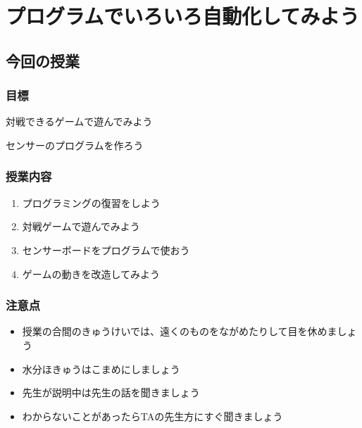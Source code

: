 \chapter{プログラムでいろいろ自動化してみよう}
\section{今回の授業}
\subsection{目標}
対戦できるゲームで遊んでみよう

センサーのプログラムを作ろう

\subsection{授業内容}
\begin{enumerate}
    \item プログラミングの復習をしよう
    \item 対戦ゲームで遊んでみよう
    \item センサーボードをプログラムで使おう
    \item ゲームの動きを改造してみよう
\end{enumerate}

\subsection{注意点}
\begin{itemize}
    \item 授業の合間のきゅうけいでは、遠くのものをながめたりして目を休めましょう
    \item 水分ほきゅうはこまめにしましょう
    \item 先生が説明中は先生の話を聞きましょう
    \item わからないことがあったらTAの先生方にすぐ聞きましょう
\end{itemize}